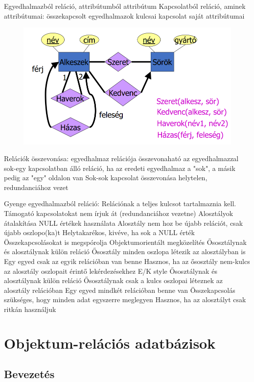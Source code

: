 \documentclass[12pt,a4paper]{article}
\begin{document}
\begin{outline}
	\1 Egyedhalmazból reláció, attribútumból attribútum
	\1 Kapcsolatból reláció, aminek attribútumai:
		\2 összekapcsolt egyedhalmazok kulcsai
		\2 kapcsolat saját attribútumai

\begin{figure}[h!]
	\centering
	\includegraphics[width=0.4\linewidth]{EK-relációvá}
\end{figure}

	\1 Relációk összevonása: egyedhalmaz relációja összevonaható az egyedhalmazzal sok-egy kapcsolatban álló reláció, ha az eredeti egyedhalmaz a "sok", a másik pedig az "egy" oldalon van
		\2 Sok-sok kapcsolat összevonása helytelen, redundanciához vezet

\pagebreak

	\1 Gyenge egyedhalmazból reláció:
		\2 Relációnak a teljes kulcsot tartalmaznia kell.
		\2 Támogató kapcsolatokat nem írjuk át (redundanciához vezetne)
	\1 Alosztályok átalakítása
		\2 NULL értékek használata
			\3 Alosztály nem hoz be újabb relációt, csak újabb oszlopo(ka)t
			\3 Helytakarékos, kivéve, ha sok a NULL érték
			\3 Összekapcsolásokat is megspórolja
		\2 Objektumorientált megközelítés
			\3 Ősosztálynak és alosztálynak külön reláció
			\3 Ősosztály minden oszlopa létezik az alosztályban is
			\3 Egy egyed csak az egyik relációban van benne
			\3 Hasznos, ha az ősosztály nem-kulcs az alosztály oszlopait érintő lekérdezésekhez
		\2 E/K style
			\3 Ősosztálynak és alosztálynak külön reláció
			\3 Ősosztálynak csak a kulcs oszlopai léteznek az alosztály relációban
			\3 Egy egyed mindkét relációban benne van
			\3 Összekapcsolás szükséges, hogy minden adat egyszerre meglegyen
			\3 Hasznos, ha az alosztályt csak ritkán használjuk
\end{outline}

\pagebreak

\section{Objektum-relációs adatbázisok}

\subsection{Bevezetés}
\end{document}
